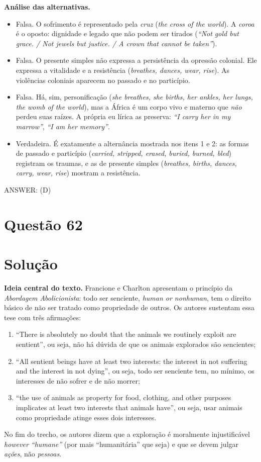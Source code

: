 \documentclass{article}%
\begin{document}
\textbf{Análise das alternativas.}
\begin{itemize}
  \item[(a)] Falsa. O sofrimento é representado pela \emph{cruz} (\textit{the cross of the world}). A \emph{coroa} é o oposto: dignidade e legado que não podem ser tirados (\textit{``Not gold but grace. / Not jewels but justice. / A crown that cannot be taken''}).
  \item[(b)] Falsa. O presente simples não expressa a persistência da opressão colonial. Ele expressa a vitalidade e a resistência (\textit{breathes, dances, wear, rise}). As violências coloniais aparecem no passado e no particípio.
  \item[(c)] Falsa. Há, sim, personificação (\textit{she breathes, she births, her ankles, her lungs, the womb of the world}), mas a África é um corpo vivo e materno que \emph{não} perdeu suas raízes. A própria eu lírica as preserva: \textit{``I carry her in my marrow''}, \textit{``I am her memory''}.
  \item[(d)] Verdadeira. É exatamente a alternância mostrada nos itens 1 e 2: as formas de passado e particípio (\textit{carried, stripped, erased, buried, burned, bled}) registram os traumas, e as de presente simples (\textit{breathes, births, dances, carry, wear, rise}) mostram a resistência.
\end{itemize}

ANSWER: (D)%
\newpage%
\section*{Questão 62}

\section*{Solução}

\textbf{Ideia central do texto.} Francione e Charlton apresentam o princípio da \emph{Abordagem Abolicionista}: todo ser senciente, \emph{human or nonhuman}, tem o direito básico de não ser tratado como propriedade de outros. Os autores sustentam essa tese com três afirmações:
\begin{enumerate}
  \item ``There is absolutely no doubt that the animals we routinely exploit are sentient'', ou seja, não há dúvida de que os animais explorados são sencientes;
  \item ``All sentient beings have at least two interests: the interest in not suffering and the interest in not dying'', ou seja, todo ser senciente tem, no mínimo, os interesses de não sofrer e de não morrer;
  \item ``the use of animals as property for food, clothing, and other purposes implicates at least two interests that animals have'', ou seja, usar animais como propriedade atinge esses dois interesses.
\end{enumerate}
No fim do trecho, os autores dizem que a exploração é moralmente injustificável \emph{however ``humane''} (por mais ``humanitária'' que seja) e que se devem julgar \emph{ações}, não \emph{pessoas}.
\end{document}
